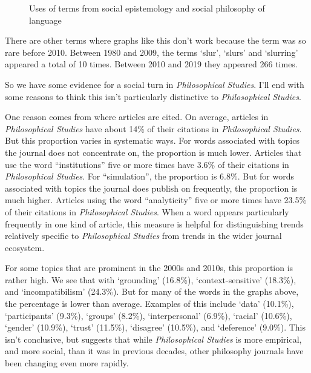 \documentclass[
  10pt,
  letterpaper,
  DIV=11,
  numbers=noendperiod,
  twoside]{scrartcl}
\begin{document}
\begin{figure}


\caption{\label{fig-social-epistemology}Uses of terms from social
epistemology and social philosophy of language}

\end{figure}%

There are other terms where graphs like this don't work because the term
was so rare before 2010. Between 1980 and 2009, the terms `slur',
`slurs' and `slurring' appeared a total of 10 times. Between 2010 and
2019 they appeared 266 times.

So we have some evidence for a social turn in \emph{Philosophical
Studies}. I'll end with some reasons to think this isn't particularly
distinctive to \emph{Philosophical Studies}.

One reason comes from where articles are cited. On average, articles in
\emph{Philosophical Studies} have about 14\% of their citations in
\emph{Philosophical Studies}. But this proportion varies in systematic
ways. For words associated with topics the journal does not concentrate
on, the proportion is much lower. Articles that use the word
``institutions'' five or more times have 3.6\% of their citations in
\emph{Philosophical Studies}. For ``simulation'', the proportion is
6.8\%. But for words associated with topics the journal does publish on
frequently, the proportion is much higher. Articles using the word
``analyticity'' five or more times have 23.5\% of their citations in
\emph{Philosophical Studies}. When a word appears particularly
frequently in one kind of article, this measure is helpful for
distinguishing trends relatively specific to \emph{Philosophical
Studies} from trends in the wider journal ecosystem.

For some topics that are prominent in the 2000s and 2010s, this
proportion is rather high. We see that with `grounding' (16.8\%),
`context-sensitive' (18.3\%), and `incompatibilism' (24.3\%). But for
many of the words in the graphs above, the percentage is lower than
average. Examples of this include `data' (10.1\%), `participants'
(9.3\%), `groups' (8.2\%), `interpersonal' (6.9\%), `racial' (10.6\%),
`gender' (10.9\%), `trust' (11.5\%), `disagree' (10.5\%), and
`deference' (9.0\%). This isn't conclusive, but suggests that while
\emph{Philosophical Studies} is more empirical, and more social, than it
was in previous decades, other philosophy journals have been changing
even more rapidly.
\end{document}
